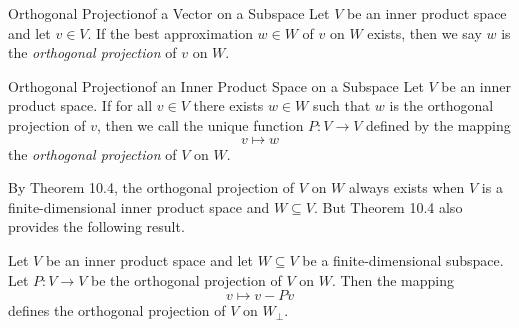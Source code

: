 \documentclass[linearalgebra]{subfiles}
\begin{document}
    \begin{definition}{Orthogonal Projection}{of a Vector on a Subspace}
        Let $V$ be an inner product space and let $v\in V$. If the best approximation $w\in W$ of $v$ on $W$ exists, then we say $w$ is the \emph{orthogonal projection} of $v$ on $W$.
    \end{definition}

    \begin{definition}{Orthogonal Projection}{of an Inner Product Space on a Subspace}
        Let $V$ be an inner product space. If for all $v\in V$ there exists $w\in W$ such that $w$ is the orthogonal projection of $v$, then we call the unique function $P: V\to V$ defined by the mapping
        \begin{equation*}
            v\mapsto w
        \end{equation*}
        the \emph{orthogonal projection} of $V$ on $W$.
    \end{definition}

    \begin{remark}
        By Theorem 10.4, the orthogonal projection of $V$ on $W$ always exists when $V$ is a finite-dimensional inner product space and $W\subseteq V$. But Theorem 10.4 also provides the following result.
    \end{remark}

    \begin{cor}{}
        Let $V$ be an inner product space and let $W\subseteq V$ be a finite-dimensional subspace. Let $P:V\to V$ be the orthogonal projection of $V$ on $W$. Then the mapping
        \begin{equation*}
            v\mapsto v-Pv
        \end{equation*}
        defines the orthogonal projection of $V$ on $W_\perp$.
    \end{cor}	
\end{document}
